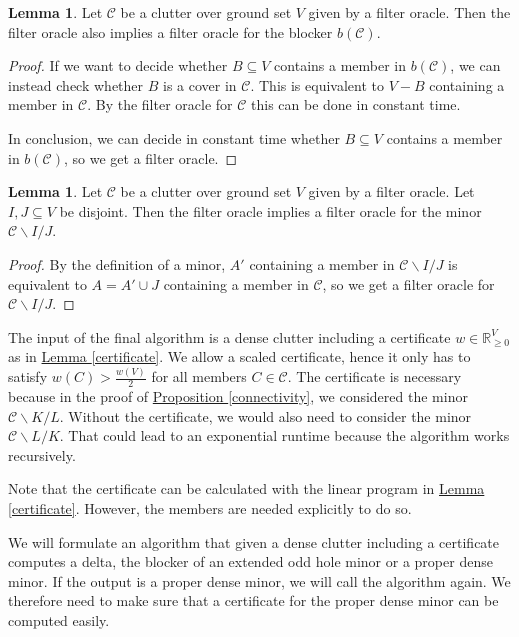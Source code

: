 \documentclass[a4paper, 12pt]{scrbook}
\theoremstyle{definition}
\newtheorem{lemma}[theorem]{Lemma}
\newcommand*{\IR}{\ensuremath{\mathbb{R}}}
\begin{document}
   \begin{lemma}
       Let $\mathcal{C}$ be a clutter over ground set $V$ given by a filter oracle.
       Then the filter oracle also implies a filter oracle for the blocker $b(\mathcal{C})$.
   \end{lemma}

   \begin{proof}
       If we want to decide whether $B \subseteq V$ contains a member in $b(\mathcal{C})$, we can instead check whether $B$ is a cover in $\mathcal{C}$. This is equivalent to $V-B$ containing a member in $\mathcal{C}$. By the filter oracle for $\mathcal{C}$ this can be done in constant time.

       In conclusion, we can decide in constant time whether $B \subseteq V$ contains a member in $b(\mathcal{C})$, so we get a filter oracle.
   \end{proof}

   \begin{lemma}
       Let $\mathcal{C}$ be a clutter over ground set $V$ given by a filter oracle. Let $I,J \subseteq V$ be disjoint.
       Then the filter oracle implies a filter oracle for the minor $\mathcal{C} \backslash I /J$.
   \end{lemma}

   \begin{proof}
       By the definition of a minor, $A'$ containing a member in $\mathcal{C} \backslash I / J$ is equivalent to $A = A' \cup J$ containing a member in $\mathcal{C}$, so we get a filter oracle for $\mathcal{C} \backslash I / J$.
   \end{proof}

   The input of the final algorithm is a dense clutter including a certificate $w \in \IR^V_{\geq 0}$ as in \hyperref[certificate]{Lemma \ref*{certificate}}. We allow a scaled certificate, hence it only has to satisfy $w(C) > \frac {w(V)}{2}$ for all members $C \in \mathcal{C}$. The certificate is necessary because in the proof of \hyperref[connectivity]{Proposition \ref*{connectivity}}, we considered the minor $\mathcal{C} \backslash K / L$. Without the certificate, we would also need to consider the minor $\mathcal{C}\backslash L / K$. That could lead to an exponential runtime because the algorithm works recursively.

   Note that the certificate can be calculated with the linear program in \hyperref[certificate]{Lemma \ref*{certificate}}. However, the members are needed explicitly to do so.

   We will formulate an algorithm that given a dense clutter including a certificate computes a delta, the blocker of an extended odd hole minor or a proper dense minor. If the output is a proper dense minor, we will call the algorithm again. We therefore need to make sure that a certificate for the proper dense minor can be computed easily.
\end{document}

